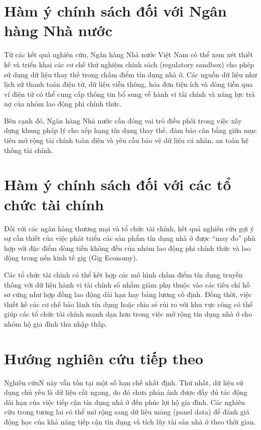 \documentclass[12pt,a4paper]{report}
\begin{document}
	\section{Hàm ý chính sách đối với Ngân hàng Nhà nước}
	
	Từ các kết quả nghiên cứu, Ngân hàng Nhà nước Việt Nam có thể xem xét thiết kế và triển khai các cơ chế thử nghiệm chính sách (regulatory sandbox) cho phép sử dụng dữ liệu thay thế trong chấm điểm tín dụng nhà ở. Các nguồn dữ liệu như lịch sử thanh toán điện tử, dữ liệu viễn thông, hóa đơn tiện ích và dòng tiền qua ví điện tử có thể cung cấp thông tin bổ sung về hành vi tài chính và năng lực trả nợ của nhóm lao động phi chính thức.
	
	Bên cạnh đó, Ngân hàng Nhà nước cần đóng vai trò điều phối trong việc xây dựng khung pháp lý cho xếp hạng tín dụng thay thế, đảm bảo cân bằng giữa mục tiêu mở rộng tài chính toàn diện và yêu cầu bảo vệ dữ liệu cá nhân, an toàn hệ thống tài chính.
	
	\section{Hàm ý chính sách đối với các tổ chức tài chính}
	
	Đối với các ngân hàng thương mại và tổ chức tài chính, kết quả nghiên cứu gợi ý sự cần thiết của việc phát triển các sản phẩm tín dụng nhà ở được ``may đo'' phù hợp với đặc điểm dòng tiền không đều của nhóm lao động phi chính thức và lao động trong nền kinh tế gig (Gig Economy).
	
	Các tổ chức tài chính có thể kết hợp các mô hình chấm điểm tín dụng truyền thống với dữ liệu hành vi tài chính số nhằm giảm phụ thuộc vào các tiêu chí hồ sơ cứng như hợp đồng lao động dài hạn hay bảng lương cố định. Đồng thời, việc thiết kế các cơ chế bảo lãnh tín dụng hoặc chia sẻ rủi ro với khu vực công có thể giúp các tổ chức tài chính mạnh dạn hơn trong việc mở rộng tín dụng nhà ở cho nhóm hộ gia đình thu nhập thấp.
	
	\section{Hướng nghiên cứu tiếp theo}
	
	Nghiên cứuN này vẫn tồn tại một số hạn chế nhất định. Thứ nhất, dữ liệu sử dụng chủ yếu là dữ liệu cắt ngang, do đó chưa phản ánh được đầy đủ tác động dài hạn của việc tiếp cận tín dụng nhà ở đến phúc lợi hộ gia đình. Các nghiên cứu trong tương lai có thể mở rộng sang dữ liệu mảng (panel data) để đánh giá động học của khả năng tiếp cận tín dụng và tích lũy tài sản nhà ở theo thời gian.
	
\end{document}
